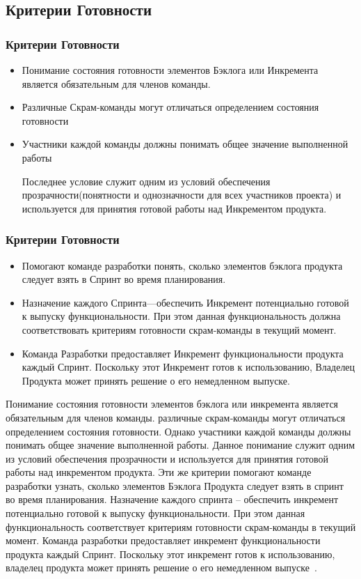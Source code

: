 \documentclass{../industrial-development}
\begin{document}
\subsection{Критерии Готовности}

\begin{frame} \frametitle {Критерии Готовности}

\begin{itemize}
	\item Понимание состояния готовности элементов Бэклога или Инкремента является
обязательным для членов команды. 
  \item Различные Скрам‐команды могут отличаться определением состояния готовности
 \item Участники каждой команды должны понимать общее значение выполненной работы
\begin{block}{}
Последнее условие служит одним из условий обеспечения \alert{прозрачности}(понятности и однозначности для всех участников проекта) и используется для принятия готовой работы над \alert{Инкрементом продукта}.
\end{block}
\end{itemize}
\end {frame}


\begin{frame} \frametitle {Критерии Готовности}
\begin{itemize}
	\item Помогают команде разработки понять, \alert{сколько элементов бэклога продукта следует взять в Спринт} во время планирования.
 \item Назначение каждого Спринта---обеспечить Инкремент потенциально готовой к выпуску функциональности. При этом
данная функциональность должна соответствовать критериям готовности скрам‐команды в текущий момент.
 \item Команда Разработки предоставляет Инкремент функциональности продукта каждый Спринт. Поскольку этот Инкремент готов к использованию, Владелец Продукта может \alert{принять решение о его немедленном выпуске}.
\end{itemize}
\end {frame}
\lecturenotes
Понимание состояния готовности элементов бэклога или инкремента является
обязательным для членов команды. различные скрам‐команды могут отличаться
определением состояния готовности.
Однако участники каждой команды должны понимать общее значение выполненной
работы. Данное понимание служит одним из условий обеспечения прозрачности и
используется для принятия готовой работы над инкрементом продукта.
Эти же критерии помогают команде разработки узнать, сколько элементов Бэклога
Продукта следует взять в спринт во время планирования. Назначение каждого спринта –
обеспечить инкремент потенциально готовой к выпуску функциональности. При этом
данная функциональность соответствует критериям готовности скрам‐команды в текущий
момент.
Команда разработки предоставляет инкремент функциональности продукта каждый
Спринт. Поскольку этот инкремент готов к использованию, владелец продукта может
принять решение о его немедленном выпуске~\cite{Scrum}.
\end{document}

